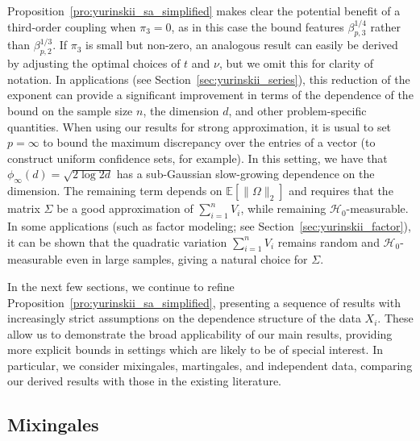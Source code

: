 \documentclass[11pt,lof]{puthesis}
\newcommand{\E}{\ensuremath{\mathbb{E}}}
\newcommand{\cH}{\ensuremath{\mathcal{H}}}
\theoremstyle{break}
\theoremstyle{proof}
\begin{document}
Proposition~\ref{pro:yurinskii_sa_simplified} makes clear the potential benefit
of a
third-order coupling when $\pi_3 = 0$, as in this case the bound features
$\beta_{p,3}^{1/4}$ rather than $\beta_{p,2}^{1/3}$. If $\pi_3$ is small but
non-zero, an analogous result can easily be derived by adjusting the optimal
choices of $t$ and $\nu$, but we omit this for clarity of notation. In
applications (see Section~\ref{sec:yurinskii_series}), this reduction of the
exponent can
provide a significant improvement in terms of the dependence of the bound on
the sample size $n$, the dimension $d$, and other problem-specific quantities.
When using our results for strong approximation, it is usual to set
$p = \infty$ to bound the maximum discrepancy over the entries of a vector (to
construct uniform confidence sets, for example). In this setting, we have that
$\phi_\infty(d) = \sqrt{2 \log 2d}$ has a sub-Gaussian slow-growing dependence
on the dimension. The remaining term depends on $\E[\|\Omega\|_2]$ and requires
that the matrix $\Sigma$ be a good approximation of $\sum_{i=1}^{n} V_i$, while
remaining $\cH_0$-measurable. In some applications (such as factor modeling;
see Section~\ref{sec:yurinskii_factor}), it can be shown that the quadratic
variation
$\sum_{i=1}^n V_i$ remains random and $\cH_0$-measurable even in large samples,
giving a natural choice for $\Sigma$.

In the next few sections, we continue to refine
Proposition~\ref{pro:yurinskii_sa_simplified}, presenting a sequence of results
with
increasingly strict assumptions on the dependence structure of the data $X_i$.
These allow us to demonstrate the broad applicability of our main results,
providing more explicit bounds in settings which are likely to be of special
interest. In particular, we consider mixingales, martingales, and independent
data, comparing our derived results with those in the existing literature.

\subsection{Mixingales}
\label{sec:yurinskii_mixingales}
\end{document}
